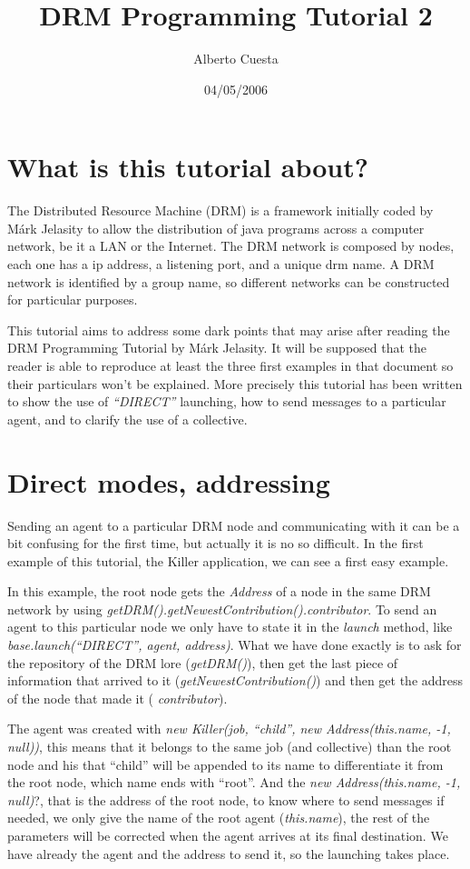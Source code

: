 \documentclass{article}
\title{DRM Programming Tutorial 2}
\author{Alberto Cuesta}
\date{04/05/2006}
\begin{document}
\maketitle

\section{What is this tutorial about?}

The Distributed Resource Machine (DRM) is a framework initially coded by M\'ark Jelasity to allow the distribution of java programs across a computer network, be it a LAN or the Internet. The DRM network is composed by nodes, each one has a ip address, a listening port, and a unique drm name. A DRM network is identified by a group name, so different networks can be constructed for particular purposes.

This tutorial aims to address some dark points that may arise after reading the DRM Programming Tutorial by M\'ark Jelasity. It will be supposed that the reader is able to reproduce at least the three first examples in that document so their particulars won't be explained. More precisely this tutorial has been written to show the use of \textsl{``DIRECT''} launching, how to send messages to a particular agent, and to clarify the use of a collective.

\section{Direct modes, addressing}
Sending an agent to a particular DRM node and communicating with it can be a bit confusing for the first time, but actually it is no so difficult. In the first example of this tutorial, the Killer application, we can see a first easy example. 

In this example, the root node gets the \textsl{Address} of a node in the same DRM network by using \textsl{getDRM().getNewestContribution().contributor}. To send an agent to this particular node we only have to state it in the \textsl{launch} method, like \textsl{base.launch(``DIRECT'', agent, address)}. What we have done exactly is to ask for the repository of the DRM lore (\textsl{getDRM()}), then get the last piece of information that arrived to it (\textsl{getNewestContribution()}) and then get the address of the node that made it (\textsl{ contributor}). 

The agent was created with \textsl{new Killer(job, ``child'', new Address(this.name, -1, null))}, this means that it belongs to the same job (and collective) than the root node and his that ``child'' will be appended to its name to differentiate it from the root node, which name ends with ``root''. And the \textsl{new Address(this.name, -1, null)}?, that is the address of the root node, to know where to send messages if needed, we only give the name of the root agent (\textsl{this.name}), the rest of the parameters will be corrected when the agent arrives at its final destination. We have already the agent and the address to send it, so the launching takes place.
\end{document}
